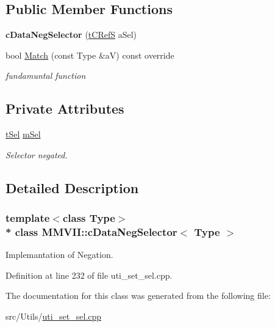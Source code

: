 \subsection*{Public Member Functions}
\begin{DoxyCompactItemize}
\item 
{\bfseries c\+Data\+Neg\+Selector} (\hyperlink{classMMVII_1_1cSelector}{t\+C\+RefS} a\+Sel)\hypertarget{classMMVII_1_1cDataNegSelector_a9d94ffb76ba94c6746eb88a006eb2864}{}\label{classMMVII_1_1cDataNegSelector_a9d94ffb76ba94c6746eb88a006eb2864}

\item 
bool \hyperlink{classMMVII_1_1cDataNegSelector_acb34de014ebc15a35b1a1158227a13bc}{Match} (const Type \&aV) const override\hypertarget{classMMVII_1_1cDataNegSelector_acb34de014ebc15a35b1a1158227a13bc}{}\label{classMMVII_1_1cDataNegSelector_acb34de014ebc15a35b1a1158227a13bc}

\begin{DoxyCompactList}\small\item\em fundamuntal function \end{DoxyCompactList}\end{DoxyCompactItemize}
\subsection*{Private Attributes}
\begin{DoxyCompactItemize}
\item 
\hyperlink{classMMVII_1_1cSelector}{t\+Sel} \hyperlink{classMMVII_1_1cDataNegSelector_abfc25323bd7f6f350e2c8ea1ac7b6c8f}{m\+Sel}\hypertarget{classMMVII_1_1cDataNegSelector_abfc25323bd7f6f350e2c8ea1ac7b6c8f}{}\label{classMMVII_1_1cDataNegSelector_abfc25323bd7f6f350e2c8ea1ac7b6c8f}

\begin{DoxyCompactList}\small\item\em Selector negated. \end{DoxyCompactList}\end{DoxyCompactItemize}


\subsection{Detailed Description}
\subsubsection*{template$<$class Type$>$\\*
class M\+M\+V\+I\+I\+::c\+Data\+Neg\+Selector$<$ Type $>$}

Implemantation of Negation. 

Definition at line 232 of file uti\+\_\+set\+\_\+sel.\+cpp.



The documentation for this class was generated from the following file\+:\begin{DoxyCompactItemize}
\item 
src/\+Utils/\hyperlink{uti__set__sel_8cpp}{uti\+\_\+set\+\_\+sel.\+cpp}\end{DoxyCompactItemize}
